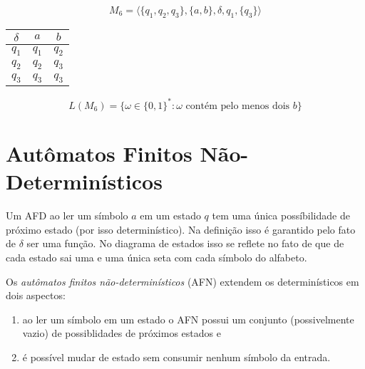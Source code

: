 \begin{example}
  \begin{displaymath}
    M_6 = \langle \{q_1, q_2, q_3\}, \{a,b\}, \delta, q_1, \{q_3\}\rangle
  \end{displaymath}

  \begin{center}
  \begin{tabular}{c|cc}
    $\delta$ & $a$ & $b$ \\
    \hline
    $q_1$ & $q_1$ & $q_2$\\
    $q_2$ & $q_2$ & $q_3$\\
    $q_3$ & $q_3$ & $q_3$\\
  \end{tabular}
  \end{center}

  \begin{center}
  \end{center}

  \begin{displaymath}
    L(M_6) = \{\omega \in \{0,1\}^* : \omega \textrm{ contém pelo menos dois } b \}
  \end{displaymath}
\end{example}

\section{Autômatos Finitos Não-Determinísticos}
\label{sec:afn}

Um AFD ao ler um símbolo $a$ em um estado $q$ tem uma única possíbilidade de próximo estado (por isso determinístico).
Na definição isso é garantido pelo fato de $\delta$ ser uma função.
No diagrama de estados isso se reflete no fato de que de cada estado sai uma e uma única seta com cada símbolo do alfabeto.

Os {\em autômatos finitos não-determinísticos} (AFN) extendem os determinísticos em dois aspectos:
\begin{enumerate}
\item ao ler um símbolo em um estado o AFN possui um conjunto (possivelmente vazio) de possiblidades de próximos estados e
\item é possível mudar de estado sem consumir nenhum símbolo da entrada.
\end{enumerate}

